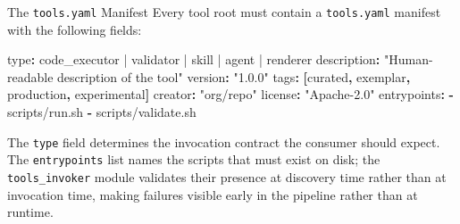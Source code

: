 \documentclass[
  ignorenonframetext,
]{beamer}
\newenvironment{Shaded}{}{}
\newcommand{\AttributeTok}[1]{\textcolor[rgb]{0.49,0.56,0.16}{#1}}
\newcommand{\FunctionTok}[1]{\textcolor[rgb]{0.02,0.16,0.49}{#1}}
\newcommand{\KeywordTok}[1]{\textcolor[rgb]{0.00,0.44,0.13}{\textbf{#1}}}
\newcommand{\StringTok}[1]{\textcolor[rgb]{0.25,0.44,0.63}{#1}}
\begin{document}
\begin{frame}{The \texttt{tools.yaml}
Manifest}
\protect{}\label{the-tools.yaml-manifest}
Every tool root must contain a \texttt{tools.yaml} manifest with the
following fields:

\begin{Shaded}
\begin{Highlighting}[]
\FunctionTok{type}\KeywordTok{:}\AttributeTok{ code\_executor | validator | skill | agent | renderer}
\FunctionTok{description}\KeywordTok{:}\AttributeTok{ }\StringTok{"Human{-}readable description of the tool"}
\FunctionTok{version}\KeywordTok{:}\AttributeTok{ }\StringTok{"1.0.0"}
\FunctionTok{tags}\KeywordTok{:}\AttributeTok{ }\KeywordTok{[}\AttributeTok{curated}\KeywordTok{,}\AttributeTok{ exemplar}\KeywordTok{,}\AttributeTok{ production}\KeywordTok{,}\AttributeTok{ experimental}\KeywordTok{]}
\FunctionTok{creator}\KeywordTok{:}\AttributeTok{ }\StringTok{"org/repo"}
\FunctionTok{license}\KeywordTok{:}\AttributeTok{ }\StringTok{"Apache{-}2.0"}
\FunctionTok{entrypoints}\KeywordTok{:}
\AttributeTok{  }\KeywordTok{{-}}\AttributeTok{ scripts/run.sh}
\AttributeTok{  }\KeywordTok{{-}}\AttributeTok{ scripts/validate.sh}
\end{Highlighting}
\end{Shaded}

The \texttt{type} field determines the invocation contract the consumer
should expect. The \texttt{entrypoints} list names the scripts that must
exist on disk; the \texttt{tools\_invoker} module validates their
presence at discovery time rather than at invocation time, making
failures visible early in the pipeline rather than at runtime.
\end{frame}
\end{document}
